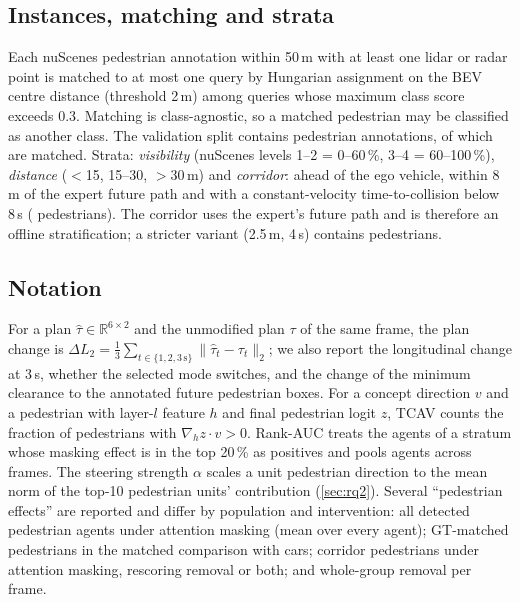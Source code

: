 \documentclass[journal]{IEEEtran}
\begin{document}
\subsection{Instances, matching and strata}
Each nuScenes pedestrian annotation within 50\,m with at least one lidar or radar point is matched to at most one
query by Hungarian assignment on the BEV centre distance (threshold 2\,m) among queries whose maximum class score
exceeds 0.3. Matching is class-agnostic, so a matched pedestrian may be classified as another class. The validation
split contains \NvalPed{} pedestrian annotations, of which \ValPedRecall{} are matched. Strata: \emph{visibility}
(nuScenes levels 1--2 = 0--60\,\%, 3--4 = 60--100\,\%), \emph{distance} ($<$15, 15--30, $>$30\,m) and \emph{corridor}:
ahead of the ego vehicle, within 8\,m of the expert future path and with a constant-velocity time-to-collision below
8\,s (\NcritWeight{} pedestrians). The corridor uses the expert's future path and is therefore an offline
stratification; a stricter variant (2.5\,m, 4\,s) contains \NcritStrict{} pedestrians.

\subsection{Notation}
For a plan $\hat{\tau}\in\mathbb{R}^{6\times2}$ and the unmodified plan $\tau$ of the same frame, the plan change is
$\Delta L_2 = \tfrac{1}{3}\sum_{t\in\{1,2,3\,\mathrm{s}\}}\lVert\hat{\tau}_t-\tau_t\rVert_2$; we also report the
longitudinal change at 3\,s, whether the selected mode switches, and the change of the minimum clearance to the
annotated future pedestrian boxes. For a concept direction $v$ and a pedestrian with layer-$l$ feature $h$ and final
pedestrian logit $z$, TCAV counts the fraction of pedestrians with $\nabla_h z\cdot v>0$. Rank-AUC treats the agents of
a stratum whose masking effect is in the top 20\,\% as positives and pools agents across frames. The steering strength
$\alpha$ scales a unit pedestrian direction to the mean norm of the top-10 pedestrian units' contribution
(\cref{sec:rq2}). Several ``pedestrian effects'' are reported and differ by population and intervention: all detected
pedestrian agents under attention masking (mean over every agent); GT-matched pedestrians in the matched comparison
with cars; corridor pedestrians under attention masking, rescoring removal or both; and whole-group removal per frame.
\end{document}
